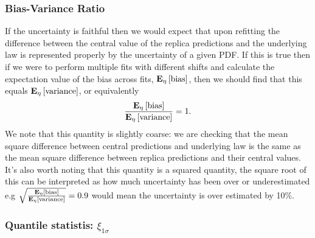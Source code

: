 \subsubsection{Bias-Variance Ratio}

If the uncertainty is faithful then we would expect that upon refitting the
difference between the central value of the replica predictions and the underlying
law is represented properly by the uncertainty of a given PDF. If this is true
then if we were to perform multiple fits with different shifts and calculate the
expectation value of the bias across fits, $\mathbf{E}_{\eta}\left[ {\rm bias} \right]$, then we should find
that this equals $\mathbf{E}_{\eta}\left[ {\rm variance} \right]$, or equivalently
\begin{equation}
    \frac{\mathbf{E}_{\eta}\left[ {\rm bias} \right]}{\mathbf{E}_{\eta}\left[ {\rm variance} \right]} = 1.
\end{equation}
We note that this quantity is slightly coarse: we are checking that the mean square
difference between central predictions and underlying law is the same as the
mean square difference between replica predictions and their central values.
It's also worth noting that this quantity is a squared quantity, the square
root of this can be interpreted as how much uncertainty has been over or
underestimated e.g $\sqrt{\frac{\mathbf{E}_{\eta}\left[ {\rm bias} \right]}{\mathbf{E}_{\eta}\left[ {\rm variance} \right]}} = 0.9$ would
mean the uncertainty is over estimated by 10\%.

\subsubsection{Quantile statistis: $\xi_{1\sigma}$}

